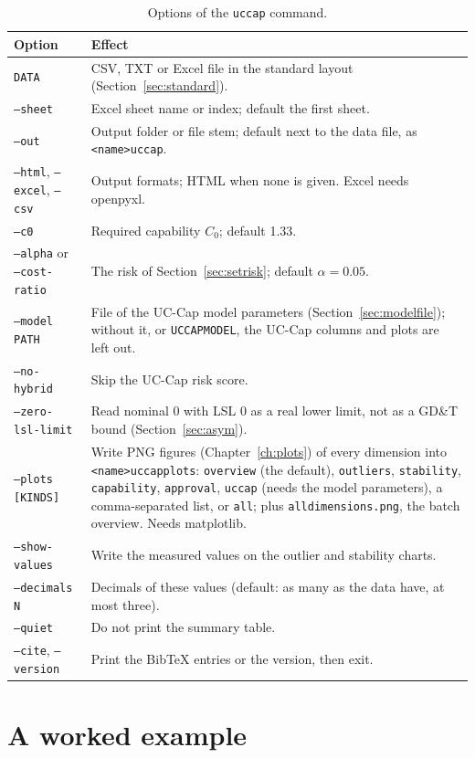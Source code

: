 \documentclass[a4paper,11pt,oneside,openany,parskip=half-,headings=standardclasses,toc=flat,numbers=noenddot]{scrbook}
\newcommand{\thead}[1]{{\sffamily\bfseries\footnotesize #1}}
\newcommand{\code}[1]{\texttt{\begingroup\def\_{\textunderscore\allowbreak}#1\endgroup}}
\newcommand{\secref}[1]{Section~\ref{#1}}
\newcommand{\chapref}[1]{Chapter~\ref{#1}}
\begin{document}
\begin{table}[H]
\caption{Options of the \code{uccap} command.}\label{tab:cli}
\small
\begin{tabularx}{\textwidth}{@{}P{37mm}L@{}}
\toprule
\thead{Option} & \thead{Effect}\\
\midrule
\code{DATA} & CSV, TXT or Excel file in the standard layout (\secref{sec:standard}).\\
\code{--sheet} & Excel sheet name or index; default the first sheet.\\
\code{--out} & Output folder or file stem; default next to the data file, as \code{<name>\_uccap}.\\
\code{--html}, \code{--excel}, \code{--csv} & Output formats; HTML when none is given. Excel needs openpyxl.\\
\code{--c0} & Required capability $C_0$; default 1.33.\\
\code{--alpha} or \code{--cost-ratio} & The risk of \secref{sec:setrisk}; default $\alpha = 0.05$.\\
\code{--model PATH} & File of the UC-Cap model parameters (\secref{sec:modelfile}); without it, or \code{UCCAP\_MODEL}, the UC-Cap columns and plots are left out.\\
\code{--no-hybrid} & Skip the UC-Cap risk score.\\
\code{--zero-lsl-limit} & Read nominal 0 with LSL 0 as a real lower limit, not as a GD\&T bound (\secref{sec:asym}).\\
\code{--plots [KINDS]} & Write PNG figures (\chapref{ch:plots}) of every dimension into \code{<name>\_uccap\_plots}: \code{overview} (the default), \code{outliers}, \code{stability}, \code{capability}, \code{approval}, \code{uccap} (needs the model parameters), a comma-separated list, or \code{all}; plus \code{all\_dimensions.png}, the batch overview. Needs matplotlib.\\
\code{--show-values} & Write the measured values on the outlier and stability charts.\\
\code{--decimals N} & Decimals of these values (default: as many as the data have, at most three).\\
\code{--quiet} & Do not print the summary table.\\
\code{--cite}, \code{--version} & Print the BibTeX entries or the version, then exit.\\
\bottomrule
\end{tabularx}
\end{table}

\section{A worked example}
\end{document}
